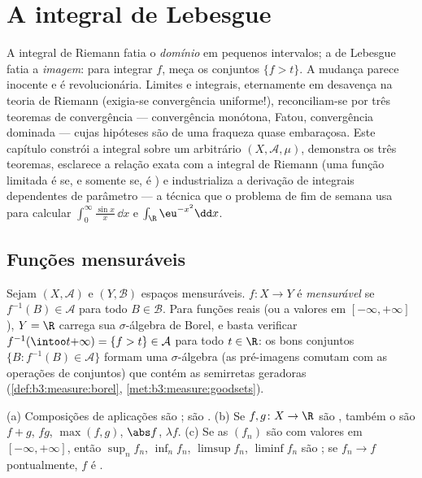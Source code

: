 \chapter{A integral de Lebesgue}\label{ch:b3:lebesgue}

A integral de Riemann fatia o \emph{domínio} em pequenos intervalos; a
de Lebesgue fatia a \emph{imagem}: para integrar $f$, meça os
conjuntos $\{f > t\}$. A mudança parece inocente e é revolucionária. Limites e
integrais, eternamente em desavença na teoria de Riemann (exigia-se
convergência uniforme!), reconciliam-se por três teoremas de
convergência --- convergência monótona, Fatou, convergência dominada
--- cujas hipóteses são de uma fraqueza quase embaraçosa. Este capítulo
constrói a integral sobre um  arbitrário $(X, \mathcal A,
\mu)$,
demonstra os três teoremas, esclarece a relação exata com a integral de
Riemann (uma função limitada é  se, e somente se, é
 ) e industrializa a derivação de integrais
dependentes de parâmetro --- a técnica que o problema de fim de semana
usa para calcular $\int_0^\infty\frac{\sin x}x\,\dd x$ e $\int_\R \eu^{-x^2}\dd x$.

\section{Funções mensuráveis}

\begin{definition}\label{def:b3:lebesgue:measurable}
Sejam $(X, \mathcal A)$ e $(Y, \mathcal B)$ espaços mensuráveis. $f \colon X \to Y$ é
\emph{mensurável} se $f^{-1}(B) \in \mathcal A$ para todo $B \in
\mathcal B$. Para
funções reais (ou a valores em $[-\infty,+\infty]$), $Y = \R$ carrega sua
$\sigma$-álgebra de Borel, e basta verificar $f^{-1}(\intoo t{+\infty}) = \{f > t\} \in
\mathcal A$ para todo $t \in \R$: os
bons conjuntos $\{B :
f^{-1}(B) \in \mathcal A\}$ formam uma $\sigma$-álgebra (as pré-imagens
comutam com as operações de conjuntos) que contém as semirretas
geradoras (\cref{def:b3:measure:borel}, \cref{met:b3:measure:goodsets}).
\end{definition}

\begin{proposition}\label{prop:b3:lebesgue:stability}
(a) Composições de aplicações  são ;  são .
(b) Se $f, g \colon X \to \R$ são , também o são $f + g$, $fg$, $\max(f,g)$,
$\abs f$, $\lambda f$.
(c) Se as $(f_n)$ são  com valores em $[-\infty, +\infty]$, então $\sup_nf_n$,
$\inf_nf_n$, $\limsup f_n$, $\liminf f_n$ são ; se $f_n \to f$ pontualmente, $f$ é
.
\end{proposition}


